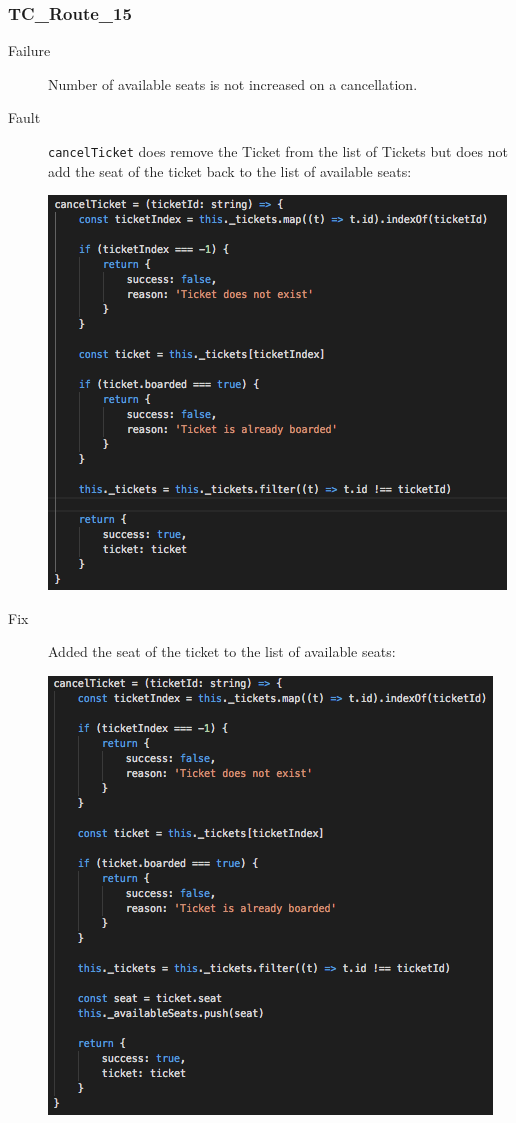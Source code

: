 \documentclass[11pt]{article}
\begin{document}
\subsubsection{TC\_Route\_15}
\label{sec:orgdc64618}

\begin{description}
\item[{Failure}] Number of available seats is not increased on a
cancellation.
\item[{Fault}] \texttt{cancelTicket} does remove the Ticket from the list of Tickets but
does not add the seat of the ticket back to the list of available
seats:
\begin{center}
\includegraphics[width=.9\linewidth]{./Iteration2.rtfd/Pasted Graphic 2.tiff.png}
\end{center}
\item[{Fix}] Added the seat of the ticket to the list of available seats:
\begin{center}
\includegraphics[width=.9\linewidth]{./Iteration2.rtfd/1_Pasted Graphic 3.tiff.png}
\end{center}
\end{description}
\end{document}
